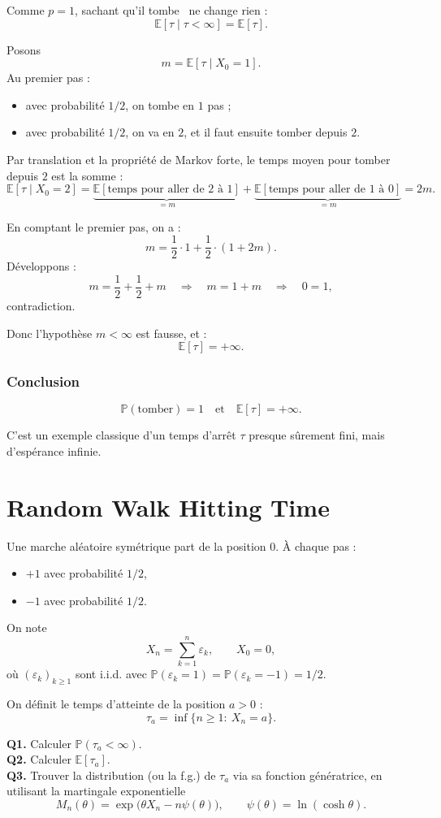 Comme $p=1$, \og sachant qu'il tombe \fg\ ne change rien :
\[
\mathbb{E}[\tau\mid \tau<\infty]=\mathbb{E}[\tau].
\]

Posons
\[
m=\mathbb{E}[\tau\mid X_0=1].
\]
Au premier pas :
\begin{itemize}
\item avec probabilité $1/2$, on tombe en $1$ pas ;
\item avec probabilité $1/2$, on va en $2$, et il faut ensuite tomber depuis $2$.
\end{itemize}

Par translation et la propriété de Markov forte, le temps moyen pour tomber depuis $2$ est la somme :
\[
\mathbb{E}[\tau\mid X_0=2] = \underbrace{\mathbb{E}[\text{temps pour aller de }2\text{ à }1]}_{=m}
+\underbrace{\mathbb{E}[\text{temps pour aller de }1\text{ à }0]}_{=m}
=2m.
\]

En comptant le premier pas, on a :
\[
m=\frac12\cdot 1+\frac12\cdot (1+2m).
\]
Développons :
\[
m=\frac12+\frac12+m
\quad\Longrightarrow\quad
m=1+m
\quad\Longrightarrow\quad
0=1,
\]
contradiction.

Donc l'hypothèse $m<\infty$ est fausse, et :
\[
\boxed{\mathbb{E}[\tau]=+\infty.}
\]

\subsubsection*{Conclusion}

\[
\boxed{\mathbb{P}(\text{tomber})=1 \quad\text{et}\quad \mathbb{E}[\tau]=+\infty.}
\]

C'est un exemple classique d'un temps d'arrêt $\tau$ presque sûrement fini, mais d'espérance infinie.

\section{Random Walk Hitting Time}

\begin{exerciseBox}
Une marche aléatoire symétrique part de la position $0$. À chaque pas :
\begin{itemize}
\item $+1$ avec probabilité $1/2$,
\item $-1$ avec probabilité $1/2$.
\end{itemize}

On note
\[
X_n=\sum_{k=1}^{n}\varepsilon_k,\qquad X_0=0,
\]
où $(\varepsilon_k)_{k\ge1}$ sont i.i.d. avec $\mathbb{P}(\varepsilon_k=1)=\mathbb{P}(\varepsilon_k=-1)=1/2$.

On définit le temps d'atteinte de la position $a>0$ :
\[
\tau_a=\inf\{n\ge 1:\ X_n=a\}.
\]

\textbf{Q1.} Calculer $\mathbb{P}(\tau_a<\infty)$.\\
\textbf{Q2.} Calculer $\mathbb{E}[\tau_a]$.\\
\textbf{Q3.} Trouver la distribution (ou la f.g.) de $\tau_a$ via sa fonction génératrice, en utilisant la martingale exponentielle
\[
M_n(\theta)=\exp\!\big(\theta X_n-n\psi(\theta)\big),
\qquad \psi(\theta)=\ln(\cosh \theta).
\]
\end{exerciseBox}


